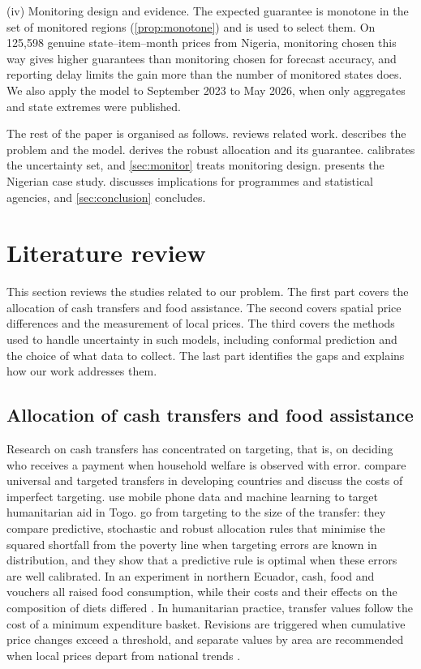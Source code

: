 \documentclass[preprint,12pt,number]{elsarticle}%
\theoremstyle{definition}
\theoremstyle{remark}
\begin{document}
(iv) Monitoring design and evidence. The expected guarantee is monotone in the set of monitored regions (\cref{prop:monotone}) and is used to select them. On 125,598 genuine state--item--month prices from Nigeria, monitoring chosen this way gives higher guarantees than monitoring chosen for forecast accuracy, and reporting delay limits the gain more than the number of monitored states does. We also apply the model to September 2023 to May 2026, when only aggregates and state extremes were published.

The rest of the paper is organised as follows.  reviews related work.  describes the problem and the model.  derives the robust allocation and its guarantee.  calibrates the uncertainty set, and \cref{sec:monitor} treats monitoring design.  presents the Nigerian case study.  discusses implications for programmes and statistical agencies, and \cref{sec:conclusion} concludes.

\section{Literature review}\label{sec:lit}

This section reviews the studies related to our problem. The first part covers the allocation of cash transfers and food assistance. The second covers spatial price differences and the measurement of local prices. The third covers the methods used to handle uncertainty in such models, including conformal prediction and the choice of what data to collect. The last part identifies the gaps and explains how our work addresses them.

\subsection{Allocation of cash transfers and food assistance}

Research on cash transfers has concentrated on targeting, that is, on deciding who receives a payment when household welfare is observed with error. \citet{hanna2018ubi} compare universal and targeted transfers in developing countries and discuss the costs of imperfect targeting. \citet{aiken2022phone} use mobile phone data and machine learning to target humanitarian aid in Togo. \citet{zheng2022targeting} go from targeting to the size of the transfer: they compare predictive, stochastic and robust allocation rules that minimise the squared shortfall from the poverty line when targeting errors are known in distribution, and they show that a predictive rule is optimal when these errors are well calibrated. In an experiment in northern Ecuador, cash, food and vouchers all raised food consumption, while their costs and their effects on the composition of diets differed \citep{hidrobo2014cash}. In humanitarian practice, transfer values follow the cost of a minimum expenditure basket. Revisions are triggered when cumulative price changes exceed a threshold, and separate values by area are recommended when local prices depart from national trends \citep{gfsc2023inflation}.
\end{document}

